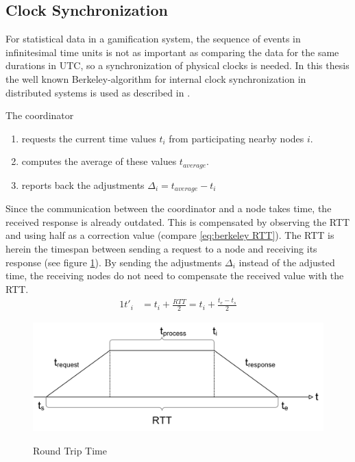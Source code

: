 		
		
		\subsection{Clock Synchronization}
		\label{Clock synchronization}
		
		For statistical data in a gamification system, the sequence of events in infinitesimal time units is not as important as comparing the data for the same durations in \gls{UTC}, so a synchronization of physical clocks is needed. In this thesis  the well known Berkeley-algorithm for internal clock synchronization in distributed systems is used as described in \textcite{Ghosh2015}.
		
		\noindent The coordinator
		\vspace{-\topsep}
		\begin{enumerate}
			\itemsep-0.5em
			\item requests the current time values $t_i$ from participating nearby nodes $i$.
			\item computes the average of these values $t_{average}$.
			\item reports back the adjustments $\Delta_{i}=t_{average}-t_i$
		\end{enumerate}
	
		Since the communication between the coordinator and a node takes time, the received response is already outdated. This is compensated by observing the \gls{RTT} and using half as a correction value (compare \ref{eq:berkeley RTT}). The \gls{RTT} is herein the timespan between sending a request to a node and receiving its response (see figure \ref{figure:berkeley RTT}). By sending the adjustments $\Delta_i$ instead of the adjusted time, the receiving nodes do not need to compensate the received value with the \gls{RTT}.
		\begin{alignat}{1}
		t'_i &=t_i+\frac{RTT}{2}=t_i+\frac{t_e-t_s}{2} \label{eq:berkeley RTT}
		\end{alignat}
		
		\begin{figure}[htbp] %
			\caption{Round Trip Time}
			\includegraphics[scale=1.0]{figures/berkeley.png}
			\label{figure:berkeley RTT}
		\end{figure}
	
